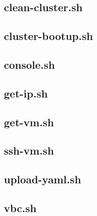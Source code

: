 \subsection{clean-cluster.sh}
\noindent


\subsection{cluster-bootup.sh}
\noindent


\subsection{console.sh}
\noindent


\subsection{get-ip.sh}
\noindent


\subsection{get-vm.sh}
\noindent


\subsection{ssh-vm.sh}
\noindent


\subsection{upload-yaml.sh}
\noindent


\subsection{vbc.sh}
\noindent

